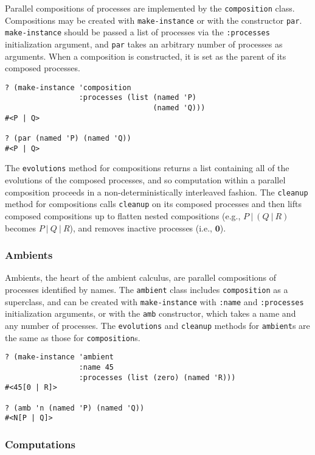\documentclass[12pt]{article}
\begin{document}
Parallel compositions of processes are implemented by the \texttt{composition} class.
Compositions may be created with \texttt{make-instance} or with the constructor \texttt{par}.
\texttt{make-instance} should be passed a list of processes via the \texttt{:processes} initialization argument, and \texttt{par} takes an arbitrary number of processes as arguments.
When a composition is constructed, it is set as the parent of its composed processes.

\begin{verbatim}
? (make-instance 'composition 
                 :processes (list (named 'P)
                                  (named 'Q)))
#<P | Q>

? (par (named 'P) (named 'Q))
#<P | Q>
\end{verbatim}

The \texttt{evolutions} method for compositions returns a list containing all of the evolutions of the composed processes, and so computation within a parallel composition proceeds in a non-deterministically interleaved fashion.
The \texttt{cleanup} method for compositions calls \texttt{cleanup} on its composed processes and then lifts composed compositions up to flatten nested compositions (e.g., $P\ |\ (Q\ |\ R)$ becomes $P\ |\ Q\ |\ R$), and removes inactive processes (i.e., $\mathbf{0}$).

\subsubsection{Ambients}
\label{sec:ambients}

Ambients, the heart of the ambient calculus, are parallel compositions of processes identified by names.
The \texttt{ambient} class includes \texttt{composition} as a superclass, and can be created with \texttt{make-instance} with \texttt{:name} and \texttt{:processes} initialization arguments, or with the \texttt{amb} constructor, which takes a name and any number of processes.
The \texttt{evolutions} and \texttt{cleanup} methods for \texttt{ambient}s are the same as those for \texttt{composition}s.

\begin{verbatim}
? (make-instance 'ambient
                 :name 45
                 :processes (list (zero) (named 'R)))
#<45[0 | R]>

? (amb 'n (named 'P) (named 'Q))
#<N[P | Q]>
\end{verbatim}

\subsubsection{Computations}
\label{sec:computations}
\end{document}
